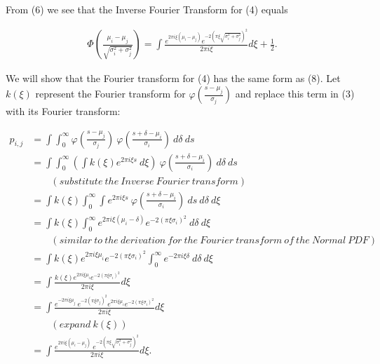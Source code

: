 \documentclass[]{article}
\begin{document}
From (6) we see that the Inverse Fourier Transform for (4) equals

\begin{align}
\Phi (\frac{\mu_i - \mu_j}{\sqrt{\sigma_i^2 + \sigma_j^2}}) = \int \frac{e^{2 \pi i \xi (\mu_i - \mu_j)} e^{-2(\pi \xi \sqrt{\sigma_i^2 + \sigma_j^2})^2}}{2 \pi i \xi} d \xi + \frac{1}{2}.
\end{align}

We will show that the Fourier transform for (4) has the same form as
(8). Let \(k(\xi)\) represent the Fourier transform for
\(\varphi (\frac{s - \mu_j}{\sigma_j})\) and replace this term in (3)
with its Fourier transform:

\begin{align*}
p_{i,j} &= \int \int_0^{\infty} \varphi(\frac{s - \mu_j}{\sigma_j})\ \varphi (\frac{s + \delta - \mu_i}{\sigma_i})\ d\delta\ ds\\
&= \int \int_0^{\infty} (\int k(\xi) e^{2 \pi i \xi s}\ d\xi)\ \varphi (\frac{s + \delta - \mu_i}{\sigma_i})\ d\delta\ ds\\
&\hspace{2em}(substitute\ the\ Inverse\ Fourier\ transform)\\
&= \int k(\xi) \int_0^{\infty} \int e^{2 \pi i \xi s}\ \varphi (\frac{s + \delta - \mu_i}{\sigma_i})\ ds\ d\delta\ d\xi\\
&= \int k(\xi) \int_0^{\infty} e^{2 \pi i \xi (\mu_i - \delta)} e^{-2(\pi \xi \sigma_i)^2}\ d\delta\ d\xi \hspace{3em}\\
&\hspace{2em}(similar\ to\ the\ derivation\ for\ the\ Fourier\ transform\ of\ the\ Normal\ PDF) \\
&= \int k(\xi) e^{2 \pi i \xi \mu_i}  e^{-2(\pi \xi \sigma_i)^2}\int_0^{\infty} e^{-2 \pi i \xi \delta}\ d\delta\ d\xi\\
&= \int \frac{k(\xi) e^{2 \pi i \xi \mu_i}  e^{-2(\pi \xi \sigma_i)^2}}{2 \pi i \xi} d\xi\\
&= \int \frac{e^{-2 \pi i \xi \mu_j}\ e^{-2(\pi \xi \sigma_j)^2} e^{2 \pi i \xi \mu_i}  e^{-2(\pi \xi \sigma_i)^2}}{2 \pi i \xi} d\xi\hspace{3em}\\
&\hspace{2em}(expand\ k(\xi))\\
&= \int \frac{e^{2 \pi i \xi (\mu_i - \mu_j)}\ e^{-2(\pi \xi \sqrt{\sigma_i^2 + \sigma_j^2})^2}}{2 \pi i \xi} d\xi.
\end{align*}
\end{document}
